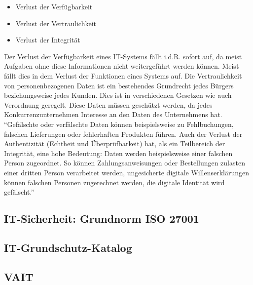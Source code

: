 \begin{itemize}
	\item Verlust der Verfügbarkeit
	\item Verlust der Vertraulichkeit
	\item Verlust der Integrität
\end{itemize}

Der Verlust der Verfügbarkeit eines IT-Systems fällt \ac{i.d.R.} sofort auf, da meist Aufgaben ohne diese Informationen nicht weitergeführt werden können. Meist fällt dies in dem Verlust der Funktionen eines Systems auf. Die Vertraulichkeit von personenbezogenen Daten ist ein bestehendes Grundrecht jedes Bürgers beziehungsweise jedes Kunden. Dies ist in verschiedenen Gesetzen wie auch Verordnung geregelt. Diese Daten müssen geschützt werden, da jedes Konkurrenzunternehmen Interesse an den Daten des Unternehmens hat. \enquote{Gefälschte oder verfälschte Daten können beispielsweise zu Fehlbuchungen, falschen Lieferungen oder fehlerhaften Produkten führen. Auch der Verlust der Authentizität (Echtheit und Überprüfbarkeit) hat, als ein Teilbereich der Integrität, eine hohe Bedeutung: Daten werden beispielsweise einer falschen Person zugeordnet. So können Zahlungsanweisungen oder Bestellungen zulasten einer dritten Person verarbeitet werden, ungesicherte digitale Willenserklärungen können falschen Personen zugerechnet werden, die digitale Identität wird	gefälscht.}\autocite[][S.1]{bundesamt_fur_sicherheit_in_der_informationstechnik_bsi_it-grundschutz-kompendium_2020}

\subsection{IT-Sicherheit: Grundnorm ISO 27001}

\subsection{IT-Grundschutz-Katalog}

\subsection{\ac{VAIT}}

